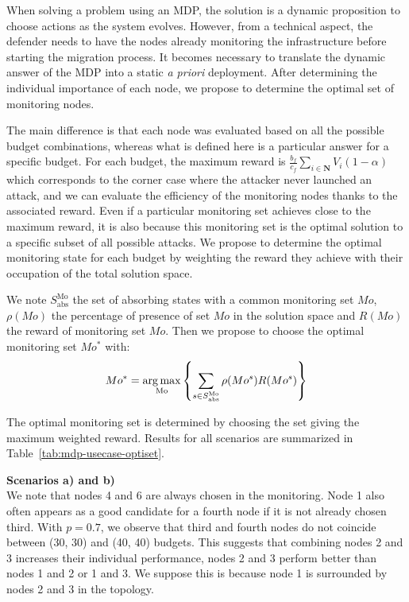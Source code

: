 When solving a problem using an MDP, the solution is a dynamic proposition to choose actions as the system evolves.
However, from a technical aspect, the defender needs to have the nodes already monitoring the infrastructure before starting the migration process.
It becomes necessary to translate the dynamic answer of the MDP into a static \textit{a priori} deployment.
After determining the individual importance of each node, we propose to determine the optimal set of monitoring nodes.

The main difference is that each node was evaluated based on all the possible budget combinations, whereas what is defined here is a particular answer for a specific budget.
For each budget, the maximum reward is $\frac{b_f}{c_f} \sum\limits_{i \in \textbf{N}}V_i(1-\alpha) $ which corresponds to the corner case where the attacker never launched an attack, and we can evaluate the efficiency of the  monitoring nodes thanks to the associated reward.
Even if a particular monitoring set achieves close to the maximum reward, it is also because this monitoring set is the optimal solution to a specific subset of all possible attacks.
We propose to determine the optimal monitoring state for each budget by weighting the reward they achieve with their occupation of the total solution space.

We note $S^{\text{Mo}}_{\text{abs}}$ the set of absorbing states with a common  monitoring set $Mo$, $\rho(Mo)$ the percentage of presence of set $Mo$ in the solution space and $R(Mo)$ the reward of monitoring set $Mo$.
Then we propose to choose the optimal monitoring set $Mo^*$ with:
\begin{equation}
    Mo^* = \operatorname*{arg\,max}\limits_{\text{Mo}} \left \{\sum\limits_{s \in S^{\text{Mo}}_{\text{abs}}}\rho(Mo^s)R(Mo^s) \right \}
\end{equation}

The optimal monitoring set is determined by choosing the set giving the maximum weighted reward.
Results for all scenarios are summarized in Table~\ref{tab:mdp-usecase-optiset}.



\textbf{Scenarios a) and b)\\}
We note that nodes 4 and 6 are always chosen in the monitoring.
Node 1 also often appears as a good candidate for a fourth node if it is not already chosen third.
With $p=0.7$, we observe that third and fourth nodes do not coincide between (30, 30) and (40, 40) budgets.
This suggests that combining nodes 2 and 3 increases their individual performance, \ie nodes 2 and 3 perform better than nodes 1 and 2 or 1 and 3.
We suppose this is because node 1 is surrounded by nodes 2 and 3 in the topology.

